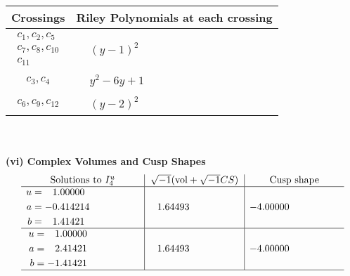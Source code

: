 \documentclass[1p]{elsarticle_modified}
\theoremstyle{definition}
\newcommand{\I}{\sqrt{-1}}
\begin{document}
\begin{tabular}{m{50pt}|m{274pt}}
Crossings & \hspace{64pt}Riley Polynomials at each crossing \\
\hline $$\begin{aligned}c_{1},c_{2},c_{5}\\c_{7},c_{8},c_{10}\\c_{11}\end{aligned}$$&$\begin{aligned}
&(y-1)^2
\end{aligned}$\\
\hline $$\begin{aligned}c_{3},c_{4}\end{aligned}$$&$\begin{aligned}
&y^2-6 y+1
\end{aligned}$\\
\hline $$\begin{aligned}c_{6},c_{9},c_{12}\end{aligned}$$&$\begin{aligned}
&(y-2)^2
\end{aligned}$\\
\hline
\end{tabular}\\~\\
\newpage\flushleft \textbf{(vi) Complex Volumes and Cusp Shapes}
$$\begin{array}{c|c|c}  
\text{Solutions to }I^u_{4}& \I (\text{vol} + \sqrt{-1}CS) & \text{Cusp shape}\\
 \hline 
\begin{aligned}
u &= \phantom{-}1.00000\phantom{ +0.000000I} \\
a &= -0.414214\phantom{ +0.000000I} \\
b &= \phantom{-}1.41421\phantom{ +0.000000I}\end{aligned}
 & \phantom{-}1.64493\phantom{ +0.000000I} & -4.00000\phantom{ +0.000000I} \\ \hline\begin{aligned}
u &= \phantom{-}1.00000\phantom{ +0.000000I} \\
a &= \phantom{-}2.41421\phantom{ +0.000000I} \\
b &= -1.41421\phantom{ +0.000000I}\end{aligned}
 & \phantom{-}1.64493\phantom{ +0.000000I} & -4.00000\phantom{ +0.000000I}\\
 \hline 
 \end{array}$$\newpage\newpage\renewcommand{\arraystretch}{1}
\end{document}
